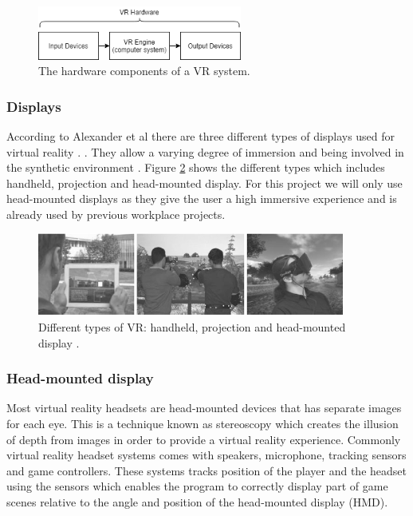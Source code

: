 \begin{figure}[!ht]
    \centering
    \includegraphics[width=0.6\textwidth]{fig/background/vrHardware.png}
    \caption{The hardware components of a VR system.}
    \label{fig:vrHardware}
\end{figure}

\subsubsection{Displays}
According to Alexander et al there are three different types of displays used for virtual reality . \cite{alexander2017virtual}. They allow a varying degree of immersion and being involved in the synthetic environment \cite{alexander2017virtual}. Figure \ref{fig:vrDiplays} shows the different types which includes handheld, projection and head-mounted display. For this project we will only use head-mounted displays as they give the user a high immersive experience and is already used by previous workplace projects.  


\begin{figure}[!ht]
    \centering
    \includegraphics[width=0.9\textwidth]{./fig/background/vrDisplays.PNG}
    \caption{Different types of VR: handheld, projection and head-mounted display \cite{alexander2017virtual}.}
    \label{fig:vrDiplays}
\end{figure}



\subsubsection{Head-mounted display}
Most virtual reality headsets are head-mounted devices that has separate images for each eye. This is a technique known as stereoscopy which creates the illusion of depth from images in order to provide a virtual reality experience. Commonly virtual reality headset systems comes with speakers, microphone, tracking sensors and game controllers. These systems tracks position of the player and the headset using the sensors which enables the program to correctly display part of game scenes relative to the angle and position of the head-mounted display (HMD).

